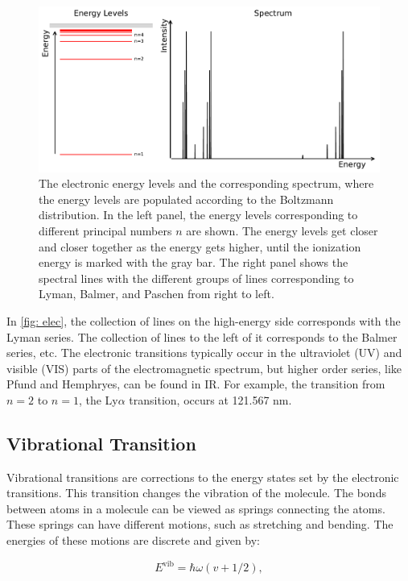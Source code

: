 \documentclass[oneside, single, authoryear, semicolon, 12pt]{lion-msc}
\newcommand{\4}{$_4$}
\newcommand{\3}{$_3$}
\newcommand{\2}{$_2$}
\begin{document}
\begin{figure}[H]
    \centering
    \includegraphics[width=.9\linewidth]{Figures/ElecSpectrum.pdf}
    \caption{The electronic energy levels and the corresponding spectrum, where the energy levels are populated according to the Boltzmann distribution. In the left panel, the energy levels corresponding to different principal numbers $n$ are shown. The energy levels get closer and closer together as the energy gets higher, until the ionization energy is marked with the gray bar. The right panel shows the spectral lines with the different groups of lines corresponding to Lyman, Balmer, and Paschen from right to left.}
    \label{fig: elec}
\end{figure}

In \autoref{fig: elec}, the collection of lines on the high-energy side corresponds with the Lyman series. The collection of lines to the left of it corresponds to the Balmer series, etc.
The electronic transitions typically occur in the ultraviolet (UV) and visible (VIS) parts of the electromagnetic spectrum, but higher order series, like Pfund and Hemphryes, can be found in IR. For example, the transition from $n=2$ to $n=1$, the Ly$\alpha$ transition, occurs at 121.567 nm.


\subsection{Vibrational Transition}
Vibrational transitions are corrections to the energy states set by the electronic transitions. This transition changes the vibration of the molecule. 
The bonds between atoms in a molecule can be viewed as springs connecting the atoms. These springs can have different motions, such as stretching and bending. The energies of these motions are discrete and given by: 

\begin{equation}
    E^{\mathrm{vib}}=\hbar\omega(v+1/2),
\end{equation}
\end{document}
